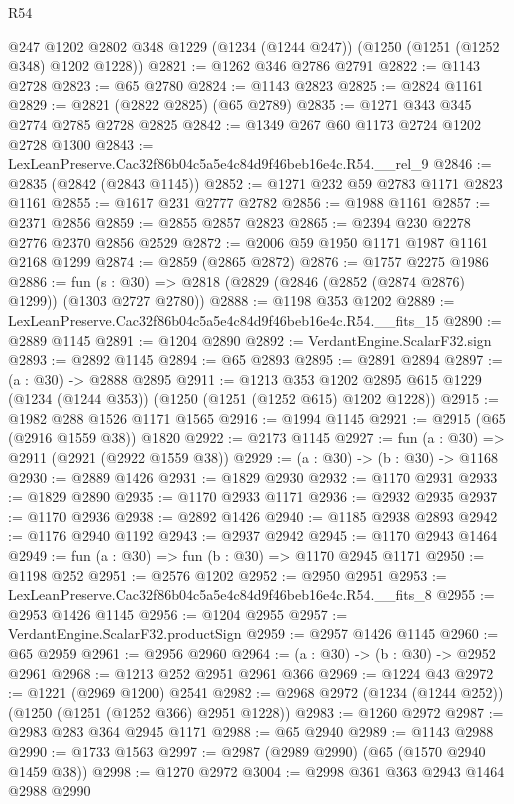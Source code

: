 \begin{lexlean}{R54}
\begin{coremodule}
    @247
    @1202
    @2802
    @348
    @1229
    (@1234 (@1244 @247))
    (@1250 (@1251 (@1252 @348) @1202 @1228))
@2821 := @1262 @346 @2786 @2791
@2822 := @1143 @2728
@2823 := @65 @2780
@2824 := @1143 @2823
@2825 := @2824 @1161
@2829 := @2821 (@2822 @2825) (@65 @2789)
@2835 := @1271 @343 @345 @2774 @2785 @2728 @2825
@2842 := @1349 @267 @60 @1173 @2724 @1202 @2728 @1300
@2843 := LexLeanPreserve.Cac32f86b04c5a5e4c84d9f46beb16e4c.R54.__rel_9
@2846 := @2835 (@2842 (@2843 @1145))
@2852 := @1271 @232 @59 @2783 @1171 @2823 @1161
@2855 := @1617 @231 @2777 @2782
@2856 := @1988 @1161
@2857 := @2371 @2856
@2859 := @2855 @2857 @2823
@2865 := @2394 @230 @2278 @2776 @2370 @2856 @2529
@2872 := @2006 @59 @1950 @1171 @1987 @1161 @2168 @1299
@2874 := @2859 (@2865 @2872)
@2876 := @1757 @2275 @1986
@2886 := fun (s : @30) => @2818 (@2829 (@2846 (@2852 (@2874 @2876) @1299)) (@1303 @2727 @2780))
@2888 := @1198 @353 @1202
@2889 := LexLeanPreserve.Cac32f86b04c5a5e4c84d9f46beb16e4c.R54.__fits_15
@2890 := @2889 @1145
@2891 := @1204 @2890
@2892 := VerdantEngine.ScalarF32.sign
@2893 := @2892 @1145
@2894 := @65 @2893
@2895 := @2891 @2894
@2897 := (a : @30) -> @2888 @2895
@2911 := @1213
    @353
    @1202
    @2895
    @615
    @1229
    (@1234 (@1244 @353))
    (@1250 (@1251 (@1252 @615) @1202 @1228))
@2915 := @1982 @288 @1526 @1171 @1565
@2916 := @1994 @1145
@2921 := @2915 (@65 (@2916 @1559 @38)) @1820
@2922 := @2173 @1145
@2927 := fun (a : @30) => @2911 (@2921 (@2922 @1559 @38))
@2929 := (a : @30) -> (b : @30) -> @1168
@2930 := @2889 @1426
@2931 := @1829 @2930
@2932 := @1170 @2931
@2933 := @1829 @2890
@2935 := @1170 @2933 @1171
@2936 := @2932 @2935
@2937 := @1170 @2936
@2938 := @2892 @1426
@2940 := @1185 @2938 @2893
@2942 := @1176 @2940 @1192
@2943 := @2937 @2942
@2945 := @1170 @2943 @1464
@2949 := fun (a : @30) => fun (b : @30) => @1170 @2945 @1171
@2950 := @1198 @252
@2951 := @2576 @1202
@2952 := @2950 @2951
@2953 := LexLeanPreserve.Cac32f86b04c5a5e4c84d9f46beb16e4c.R54.__fits_8
@2955 := @2953 @1426 @1145
@2956 := @1204 @2955
@2957 := VerdantEngine.ScalarF32.productSign
@2959 := @2957 @1426 @1145
@2960 := @65 @2959
@2961 := @2956 @2960
@2964 := (a : @30) -> (b : @30) -> @2952 @2961
@2968 := @1213 @252 @2951 @2961 @366
@2969 := @1224 @43
@2972 := @1221 (@2969 @1200) @2541
@2982 := @2968 @2972 (@1234 (@1244 @252)) (@1250 (@1251 (@1252 @366) @2951 @1228))
@2983 := @1260 @2972
@2987 := @2983 @283 @364 @2945 @1171
@2988 := @65 @2940
@2989 := @1143 @2988
@2990 := @1733 @1563
@2997 := @2987 (@2989 @2990) (@65 (@1570 @2940 @1459 @38))
@2998 := @1270 @2972
@3004 := @2998 @361 @363 @2943 @1464 @2988 @2990

\end{coremodule}
\end{lexlean}
